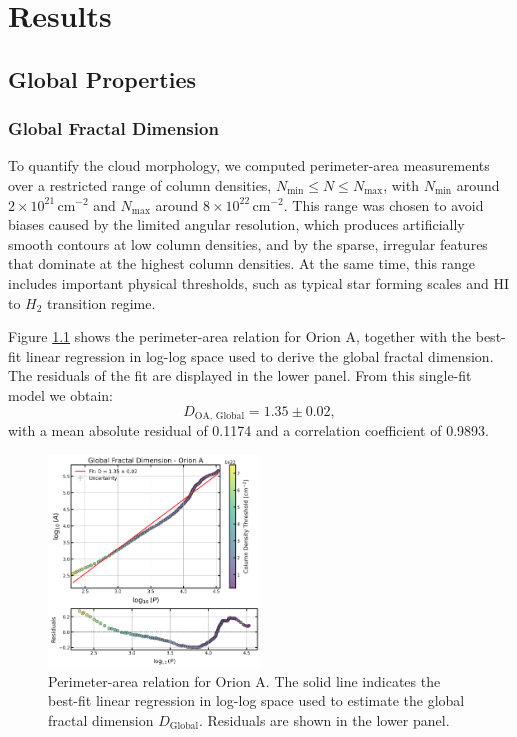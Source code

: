 \chapter{Results}
\label{ch:results}

\section{Global Properties}
\subsection{Global Fractal Dimension}

To quantify the cloud morphology, we computed perimeter-area measurements over a restricted range of column densities, \(N_\mathrm{min} \leq N \leq N_\mathrm{max}\), with \(N_\mathrm{min}\) around \(2 \times 10^{21}\,\mathrm{cm}^{-2}\) and \(N_\mathrm{max}\) around \(8 \times 10^{22}\,\mathrm{cm}^{-2}\). This range was chosen to avoid biases caused by the limited angular resolution, which produces artificially smooth contours at low column densities, and by the sparse, irregular features that dominate at the highest column densities. At the same time, this range includes important physical thresholds, such as typical star forming scales and HI to $H_2$ transition regime.

Figure \ref{fig:orion_A_global} shows the perimeter-area relation for Orion A, together with the best-fit linear regression in log-log space used to derive the global fractal dimension. The residuals of the fit are displayed in the lower panel. From this single-fit model we obtain:
\[
D_{\mathrm{OA,\,Global}} = 1.35 \pm 0.02 ,
\]
with a mean absolute residual of 0.1174 and a correlation coefficient of 0.9893.

\begin{figure}[t]
    \centering
    \includegraphics[width=0.5\textwidth]{figures/orion_A_global.png}
    \caption{Perimeter-area relation for Orion A. The solid line indicates the best-fit linear regression in log-log space used to estimate the global fractal dimension \(D_{\mathrm{Global}}\). Residuals are shown in the lower panel.}
    \label{fig:orion_A_global}
\end{figure}


